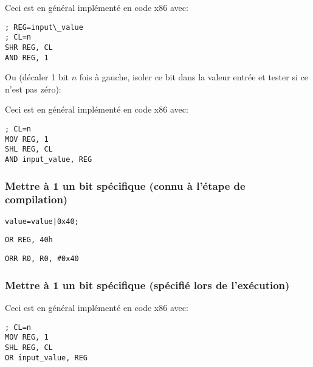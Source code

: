 

Ceci est en général implémenté en code x86 avec:

\begin{lstlisting}[caption=x86,style=customasmx86]
; REG=input\_value
; CL=n
SHR REG, CL
AND REG, 1
\end{lstlisting}

Ou (décaler 1 bit $n$ fois à gauche, isoler ce bit dans la valeur entrée et tester
si ce n'est pas zéro):



Ceci est en général implémenté en code x86 avec:

\begin{lstlisting}[caption=x86,style=customasmx86]
; CL=n
MOV REG, 1
SHL REG, CL
AND input_value, REG
\end{lstlisting}

\subsubsection{Mettre à 1 un bit spécifique (connu à l'étape de compilation)}

\begin{lstlisting}[caption=\CCpp]
value=value|0x40;
\end{lstlisting}

\begin{lstlisting}[caption=x86,style=customasmx86]
OR REG, 40h
\end{lstlisting}

\begin{lstlisting}[caption=ARM (\ARMMode) and ARM64,style=customasmARM]
ORR R0, R0, #0x40
\end{lstlisting}

\subsubsection{Mettre à 1 un bit spécifique (spécifié lors de l'exécution)}



Ceci est en général implémenté en code x86 avec:

\begin{lstlisting}[caption=x86,style=customasmx86]
; CL=n
MOV REG, 1
SHL REG, CL
OR input_value, REG
\end{lstlisting}

